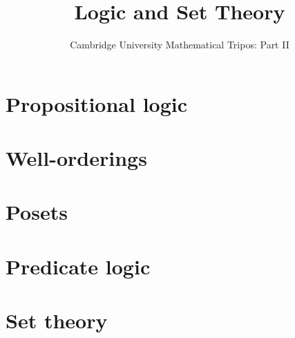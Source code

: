 \documentclass{article}
\title{Logic and Set Theory}
\author{Cambridge University Mathematical Tripos: Part II}
\begin{document}
\maketitle

\tableofcontentsnewpage{}

\section{Propositional logic}

\section{Well-orderings}

\section{Posets}

\section{Predicate logic}

\section{Set theory}

\end{document}
